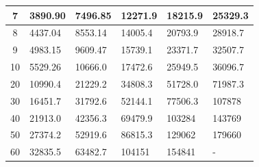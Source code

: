 \begin{table}[H]
\begin{tabular}{|c|l|l|l|l|l|}
7                                                                          & 3890.90                              & 7496.85                               & 12271.9                               & 18215.9                               & 25329.3                               \\ \hline
8                                                                          & 4437.04                              & 8553.14                               & 14005.4                               & 20793.9                               & 28918.7                               \\ \hline
9                                                                          & 4983.15                              & 9609.47                               & 15739.1                               & 23371.7                               & 32507.7                               \\ \hline
10                                                                         & 5529.26                              & 10666.0                               & 17472.6                               & 25949.5                               & 36096.7                               \\ \hline
20                                                                         & 10990.4                              & 21229.2                               & 34808.3                               & 51728.0                               & 71987.3                               \\ \hline
30                                                                         & 16451.7                              & 31792.6                               & 52144.1                               & 77506.3                               & 107878                                \\ \hline
40                                                                         & 21913.0                              & 42356.3                               & 69479.9                               & 103284                                & 143769                                \\ \hline
50                                                                         & 27374.2                              & 52919.6                               & 86815.3                               & 129062                                & 179660                                \\ \hline
60                                                                         & 32835.5                              & 63482.7                               & 104151                                & 154841                                & -                                     \\ \hline

\end{tabular}
\end{table}
